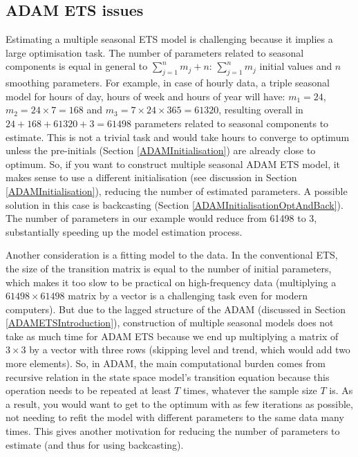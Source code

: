 \documentclass[
]{book}
\theoremstyle{definition}
\theoremstyle{definition}
\theoremstyle{definition}
\theoremstyle{definition}
\theoremstyle{remark}
\begin{document}
\hypertarget{adam-ets-issues}{%
\subsection{ADAM ETS issues}\label{adam-ets-issues}}

Estimating a multiple seasonal ETS model is challenging because it implies a large optimisation task. The number of parameters related to seasonal components is equal in general to \(\sum_{j=1}^n m_j + n\): \(\sum_{j=1}^n m_j\) initial values and \(n\) smoothing parameters. For example, in case of hourly data, a triple seasonal model for hours of day, hours of week and hours of year will have: \(m_1 = 24\), \(m_2 = 24 \times 7 = 168\) and \(m_3= 7 \times 24 \times 365 = 61320\), resulting overall in \(24 + 168 + 61320 + 3 = 61498\) parameters related to seasonal components to estimate. This is not a trivial task and would take hours to converge to optimum unless the pre-initials (Section \ref{ADAMInitialisation}) are already close to optimum. So, if you want to construct multiple seasonal ADAM ETS model, it makes sense to use a different initialisation (see discussion in Section \ref{ADAMInitialisation}), reducing the number of estimated parameters. A possible solution in this case is backcasting (Section \ref{ADAMInitialisationOptAndBack}). The number of parameters in our example would reduce from 61498 to 3, substantially speeding up the model estimation process.

Another consideration is a fitting model to the data. In the conventional ETS, the size of the transition matrix is equal to the number of initial parameters, which makes it too slow to be practical on high-frequency data (multiplying a \(61498 \times 61498\) matrix by a vector is a challenging task even for modern computers). But due to the lagged structure of the ADAM (discussed in Section \ref{ADAMETSIntroduction}), construction of multiple seasonal models does not take as much time for ADAM ETS because we end up multiplying a matrix of \(3 \times 3\) by a vector with three rows (skipping level and trend, which would add two more elements). So, in ADAM, the main computational burden comes from recursive relation in the state space model's transition equation because this operation needs to be repeated at least \(T\) times, whatever the sample size \(T\) is. As a result, you would want to get to the optimum with as few iterations as possible, not needing to refit the model with different parameters to the same data many times. This gives another motivation for reducing the number of parameters to estimate (and thus for using backcasting).
\end{document}
